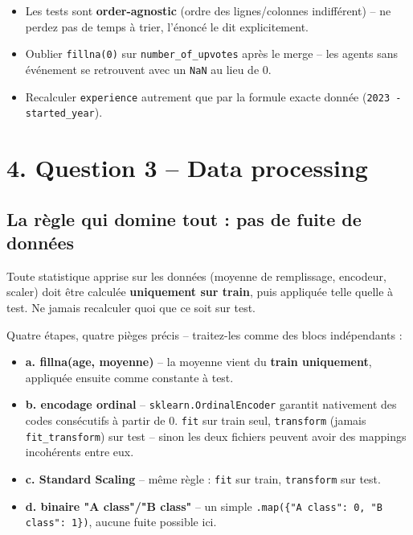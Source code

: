 \documentclass[11pt]{article}
\newcommand{\exhead}[1]{\subsection{#1}}
\begin{document}
\begin{trap}
\begin{itemize}[nosep]
  \item Les tests sont \textbf{order-agnostic} (ordre des lignes/colonnes
        indiff\'erent) -- ne perdez pas de temps \`a trier, l'\'enonc\'e le
        dit explicitement.
  \item Oublier \texttt{fillna(0)} sur \texttt{number\_of\_upvotes} apr\`es
        le merge -- les agents sans \'ev\'enement se retrouvent avec
        un \texttt{NaN} au lieu de 0.
  \item Recalculer \texttt{experience} autrement que par la formule
        exacte donn\'ee (\texttt{2023 - started\_year}).
\end{itemize}
\end{trap}

\section{4. Question 3 -- Data processing}

\exhead{La r\`egle qui domine tout : pas de fuite de donn\'ees}
Toute statistique apprise sur les donn\'ees (moyenne de remplissage,
encodeur, scaler) doit \^etre calcul\'ee \textbf{uniquement sur train},
puis appliqu\'ee telle quelle \`a test. Ne jamais recalculer quoi que ce
soit sur test.

\begin{explik}
Quatre \'etapes, quatre pi\`eges pr\'ecis -- traitez-les comme des blocs
ind\'ependants :
\begin{itemize}[nosep]
  \item \textbf{a. fillna(age, moyenne)} -- la moyenne vient du
        \textbf{train uniquement}, appliqu\'ee ensuite comme constante \`a
        test.
  \item \textbf{b. encodage ordinal} -- \texttt{sklearn.OrdinalEncoder}
        garantit nativement des codes cons\'ecutifs \`a partir de 0.
        \texttt{fit} sur train seul, \texttt{transform} (jamais
        \texttt{fit\_transform}) sur test -- sinon les deux fichiers
        peuvent avoir des mappings incoh\'erents entre eux.
  \item \textbf{c. Standard Scaling} -- m\^eme r\`egle : \texttt{fit} sur
        train, \texttt{transform} sur test.
  \item \textbf{d. binaire "A class"/"B class"} -- un simple
        \texttt{.map(\{"A class": 0, "B class": 1\})}, aucune fuite
        possible ici.
\end{itemize}
\end{explik}
\end{document}
